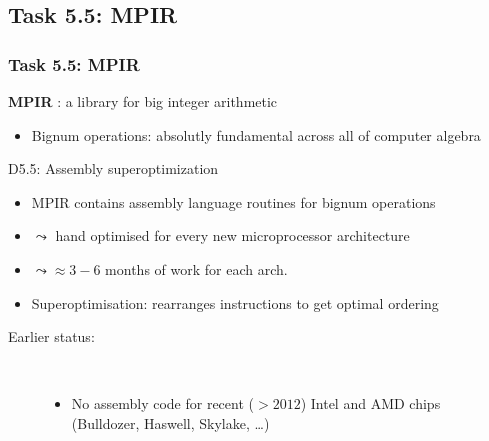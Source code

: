 \documentclass{beamer}
\begin{document}
\subsection{Task 5.5: MPIR}
\begin{frame}
  \frametitle{Task 5.5: MPIR}
\begin{center}
  {\Large  \textbf{MPIR} : a library for big integer arithmetic}
\end{center}
\begin{itemize}
  \item Bignum operations: absolutly fundamental across all of computer algebra
  \end{itemize}
  
  \begin{block}
    {D5.5: Assembly superoptimization}
    \begin{itemize}
    \item MPIR contains assembly language routines for bignum operations
    \item $\leadsto$ hand optimised for every new microprocessor
      architecture 
    \item $\leadsto \approx 3-6$ months of work for each arch.
    \item Superoptimisation: rearranges instructions to get optimal
      ordering
    \end{itemize}

    \begin{description}
      \item[Earlier status:]\
        \begin{itemize}
        \item No assembly code for recent ($> 2012$) Intel and AMD chips (Bulldozer,
          Haswell, Skylake, \dots)
        \end{itemize}
            \end{description}



    \end{block}
\end{frame}
\end{document}
